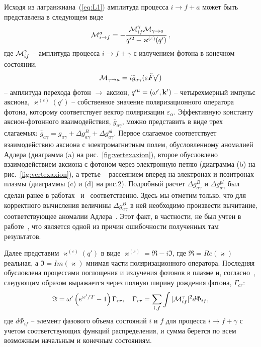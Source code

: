 Исходя из лагранжиана~(\ref{eq:L1}) амплитуда процесса $i \to f + a$ может быть
представлена в следующем виде 
%
\begin{equation}
{\cal M}^a_{i \to f} 
 = - \frac{{\cal M}^{\gamma}_{if} {\cal M}_{\gamma \to a}}
{q'^2 -\varkappa^{(\varepsilon)}(q')}\, , 
\label{eq:M1if}                                                       
\end{equation}
%
\noindent где ${\cal M}^{\gamma}_{if}$ -- амплитуда процесса $i \to f + \gamma$  с 
излучением фотона в конечном состоянии,
%
\begin{equation}
{\cal M}_{\gamma \to a} 
 = i \bar g_{a\gamma} (\varepsilon \tilde F q') 
\label{eq:M2}                                                       
\end{equation}
%
\noindent --  амплитуда перехода фотон $\to$ аксион,  $q'^{\mu} = (\omega',{\bf k}')$ --   
четырехмерный импульс аксиона, $\varkappa^{(\varepsilon)}(q')$ -- собственное значение 
 поляризационного  оператора
фотона, которому соответствует вектор поляризации $\varepsilon_{\alpha}$. Эффективную  
константу аксион-фотонного взаимодействия, $\bar g_{a\gamma}$, можно 
представить в виде трех слагаемых: $\bar g_{a\gamma} = g_{a\gamma} + 
\Delta g^{B}_{a\gamma} + \Delta g^{pl}_{a\gamma}$.    
 Первое слагаемое соответствует взаимодействию 
аксиона с электромагнитным полем, обусловленному аномалией 
Адлера (диаграмма (a) на рис.~\ref{fig:vertexaxion}), второе обусловлено 
взаимодействием аксиона  с фотоном через электронную петлю 
(диаграмма (b) на рис.~\ref{fig:vertexaxion}), а третье --   
рассеянием вперед на электронах и позитронах плазмы (диаграммы (c) и (d) 
на рис.2). Подробный расчет $\Delta g^{B}_{a\gamma}$ и
$\Delta g^{pl}_{a\gamma}$ был сделан ранее в работах~\cite{Mikheev:1999} 
и~\cite{Mikheev:2006} соответственно. 
 Здесь мы отметим только, что для корректного вычисления величины $\Delta g^{B}_{a\gamma}$  
в ней необходимо 
 произвести вычитание, соответствующее аномалии Адлера~\cite{Mikheev:1999}. 
Этот факт, в 
частности, не был учтен в работе~\cite{Skobelev:2007}, что является одной из причин  
ошибочности полученных там результатов.

Далее представим $\varkappa^{(\varepsilon)}(q')$ в виде    
$\varkappa^{(\varepsilon)} = \Re - i\Im$, 
где $\Re = Re (\varkappa)$  реальная, а $\Im =  Im (\varkappa)$  мнимая части 
поляризационного оператора. Последняя обусловлена процессами поглощения и 
излучения фотонов в плазме и,
согласно~\cite{Weldon:1983}, следующим образом выражается через полную 
ширину рождения фотона, $\Gamma_{cr}$: 
%
\begin{eqnarray}
\label{eq:I1}                                                       
\Im = \omega' \left (e^{\omega'/T} - 1 \right ) \Gamma_{cr} ,  \quad 
\Gamma_{cr} = \sum_{i,f} \int  |{\cal M}^{\gamma}_{if}|^2 d\Phi_{if} ,
\end{eqnarray}
%
\noindent где $d\Phi_{if}$ --  элемент фазового объема состояний $i$ и $f$ для процесса 
$i \to f + \gamma$ с учетом соответствующих функций распределения,  
и сумма берется по всем возможным начальным и конечным состояниям. 

